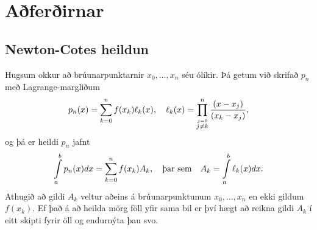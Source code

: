 \documentclass[letterpaper,10pt,icelandic]{sphinxmanual}
\begin{document}

\section{Aðferðirnar}
\label{kafli05:index-1}\label{kafli05:aferirnar}

\subsection{Newton-Cotes heildun}
\label{kafli05:newton-cotes-heildun}
Hugsum okkur að brúunarpunktarnir \(x_0, \ldots, x_n\) séu ólíkir.
Þá getum við skrifað \(p_n\) með Lagrange-margliðum
\begin{gather}
\begin{split}p_n(x) = \sum\limits_{k=0}^n f(x_k) \ell_k(x),
  \quad
  \ell_k(x) = \prod\limits_{\stackrel{j=0}{j \not= k}}^n
  \frac{(x-x_j)}{(x_k-x_j)},\end{split}\notag
\end{gather}
og þá er heildi \(p_n\) jafnt
\begin{gather}
\begin{split}\int\limits_a^b p_n(x) dx =
  \sum\limits_{k=0}^n f(x_k) A_k,
  \quad \text{þar sem} \quad
  A_k = \int\limits_a^b \ell_k(x) dx.\end{split}\notag
\end{gather}
Athugið að gildi \(A_k\) veltur aðeins á brúunarpunktunum
\(x_0, \ldots,
x_n\) en ekki gildum \(f(x_k)\). Ef það á að heilda mörg föll yfir
sama bil er því hægt að reikna gildi \(A_k\) í eitt skipti fyrir öll
og endurnýta þau svo.
\end{document}
